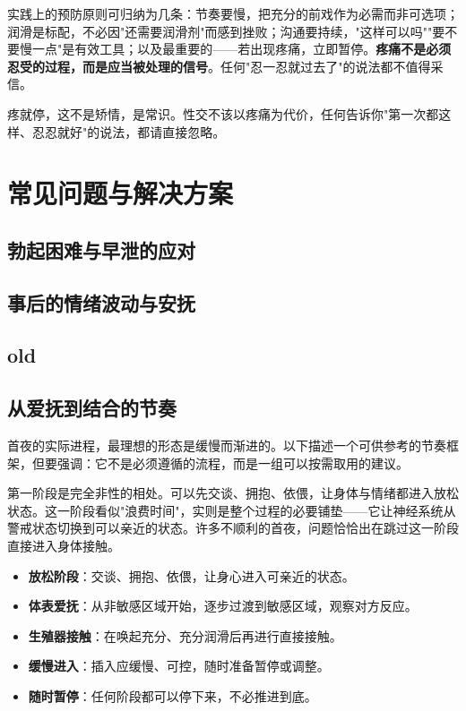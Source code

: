 \documentclass[12pt,UTF8]{ctexbook}
\newcommand{\keyword}[1]{\textbf{#1}}
\begin{document}
实践上的预防原则可归纳为几条：节奏要慢，把充分的前戏作为必需而非可选项；润滑是标配，不必因"还需要润滑剂"而感到挫败；沟通要持续，"这样可以吗""要不要慢一点"是有效工具；以及最重要的——若出现疼痛，立即暂停。\keyword{疼痛不是必须忍受的过程，而是应当被处理的信号}。任何"忍一忍就过去了"的说法都不值得采信。

\begin{tcolorbox}[colback=pink!5!white,colframe=red!50!black,title=贴心小叮咛]
	疼就停，这不是矫情，是常识。性交不该以疼痛为代价，任何告诉你"第一次都这样、忍忍就好"的说法，都请直接忽略。
\end{tcolorbox}



\section{常见问题与解决方案}
\subsection{勃起困难与早泄的应对}

\subsection{事后的情绪波动与安抚}

\subsection{old}
\subsection{从爱抚到结合的节奏}

首夜的实际进程，最理想的形态是缓慢而渐进的。以下描述一个可供参考的节奏框架，但要强调：它不是必须遵循的流程，而是一组可以按需取用的建议。

第一阶段是完全非性的相处。可以先交谈、拥抱、依偎，让身体与情绪都进入放松状态。这一阶段看似"浪费时间"，实则是整个过程的必要铺垫——它让神经系统从警戒状态切换到可以亲近的状态。许多不顺利的首夜，问题恰恰出在跳过这一阶段直接进入身体接触。

\begin{itemize}
	\item \keyword{放松阶段}：交谈、拥抱、依偎，让身心进入可亲近的状态。
	\item \keyword{体表爱抚}：从非敏感区域开始，逐步过渡到敏感区域，观察对方反应。
	\item \keyword{生殖器接触}：在唤起充分、充分润滑后再进行直接接触。
	\item \keyword{缓慢进入}：插入应缓慢、可控，随时准备暂停或调整。
	\item \keyword{随时暂停}：任何阶段都可以停下来，不必推进到底。
\end{itemize}
\end{document}
